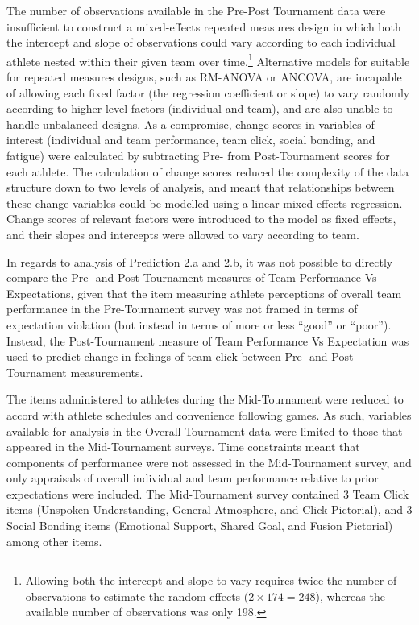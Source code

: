 \begin{CJK}{UTF8}{gbsn}
 The number of observations available in the Pre-Post Tournament data were insufficient to construct a mixed-effects repeated measures design in which both the intercept and slope of observations could vary according to each individual athlete nested within their given team over time.\footnote{Allowing both the intercept and slope to vary requires twice the number of observations to estimate the random effects ($2\times174 = 248$), whereas the available number of observations was only 198.}
 Alternative models for suitable for repeated measures designs, such as RM-ANOVA or ANCOVA, are incapable of allowing each fixed factor (the regression coefficient or slope) to vary randomly according to higher level factors (individual and team), and are also unable to handle unbalanced designs.  As a compromise, change scores in variables of interest (individual and team performance, team click, social bonding, and fatigue) were calculated by subtracting Pre- from Post-Tournament scores for each athlete. The calculation of change scores reduced the complexity of the data structure down to two levels of analysis, and meant that relationships between these change variables could be modelled using a linear mixed effects regression. Change scores of relevant factors were introduced to the model as fixed effects, and their slopes and intercepts were allowed to vary according to team.

 In regards to analysis of Prediction 2.a and 2.b, it was not possible to directly compare the Pre- and Post-Tournament measures of Team Performance Vs Expectations, given that the item measuring athlete perceptions of overall team performance in the Pre-Tournament survey was not framed in terms of expectation violation (but instead in terms of more or less ``good'' or ``poor'').  Instead, the Post-Tournament measure of Team Performance Vs Expectation was used to predict change in feelings of team click between Pre- and Post-Tournament measurements.


The items administered to athletes during the Mid-Tournament were reduced to accord with athlete schedules and convenience following games.  As such, variables available for analysis in the Overall Tournament data were limited to those that appeared in the Mid-Tournament surveys.  Time constraints meant that components of performance were not assessed in the Mid-Tournament survey, and only appraisals of overall individual and team performance relative to prior expectations were included.  The Mid-Tournament survey contained 3 Team Click items (Unspoken Understanding, General Atmosphere, and Click Pictorial), and 3 Social Bonding items (Emotional Support, Shared Goal, and Fusion Pictorial) among other items.


\end{CJK}

